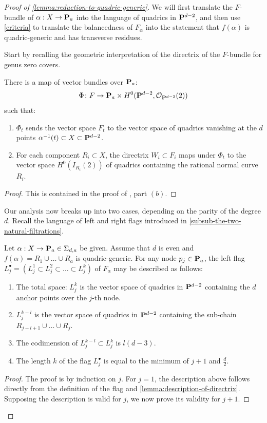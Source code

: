 \documentclass[11pt, two side, letterpaper, final]{amsart}
\renewcommand{\P}{{\bf P}}
\newcommand {\from}{\colon}
\newcommand{\cO}{\mathcal{O}}
\newcommand{\chain}[1]{\P_{#1}}
\begin{document}
\begin{proof}[Proof of \cref{lemma:reduction-to-quadric-generic}] \label{sub:proof_of_cref_lemma_reduction_to_quadric_generic}
We will first translate the $F$-bundle of $\alpha:X \to \chain{a}$ into
the language of quadrics in $\P^{d-2}$, and then use \cref{criteria}
to translate the balancedness of $F_{\alpha}$ into the statement that $f(\alpha)$ is quadric-generic and has transverse residues.

Start by recalling the geometric interpretation of the directrix of the $F$-bundle for
genus zero covers.
\begin{lemma}
\label{lemma:description-of-directrix}
There is a map of vector bundles over $\chain{a}$: 
\[
\Phi \from F \to \chain{a} \times H^0(\P^{d-2}, \cO_{\P^{d-2}}(2))
\]
such that:

\begin{enumerate}
\item $\Phi_t$ sends the vector space $F_t$ to the vector space of quadrics vanishing at the
$d$ points $\alpha^{-1}(t) \subset X \subset \P^{d-2}$. 
\item For each component $R_i \subset X$, the directrix $W_i \subset F_i$ maps under $\Phi_t$ to the
vector space $H^{0}(I_{R_{i}}(2))$ of quadrics containing the rational normal curve $R_i$.
\end{enumerate}
\end{lemma}
\begin{proof}
This is contained in the proof of , part $(b)$.
\end{proof}

Our analysis now breaks up into two cases, depending on the parity of the degree $d$. Recall the language
of left and right flags introduced in \cref{subsub-the-two-natural-filtrations}.

\begin{lemma}\label{lemma:flag-description-even}
Let $\alpha:X \to \chain{a} \in \Sigma_{d,a}$ be given. Assume that $d$ is even and $f(\alpha)=R_1 \cup \ldots \cup R_a$ is quadric-generic. For any node $p_{j} \in \chain{a}$, the 
left flag $L^\bullet_j=(L^1_j\subset L^2_j \subset \ldots \subset L^k_j)$ of $F_\alpha$ may be described as follows:
\begin{enumerate}
	\item The total space: $L_j^k$ is the vector space of quadrics in $\P^{d-2}$ containing the $d$ anchor 
	points over the $j$-th node.
	\item $L_j^{k-l}$ is the vector space of quadrics in $\P^{d-2}$ containing the sub-chain $R_{j-l+1} \cup \ldots \cup R_j$.
    \item The codimension of $L^{k-l}_j \subset L^k_j$ is $l(d-3)$. 
    \item The length $k$ of the flag $L^\bullet_j$ is equal
to the minimum of $j+1$ and $\frac{d}{2}$.
\end{enumerate}
\end{lemma}
\begin{proof}
The proof is by induction on $j$. For $j=1$, the description above follows directly from the definition of the flag
and \cref{lemma:description-of-directrix}.
Supposing the description is valid for $j$, we now prove its validity for $j+1$.


\end{proof}
\end{proof}
\end{document}
